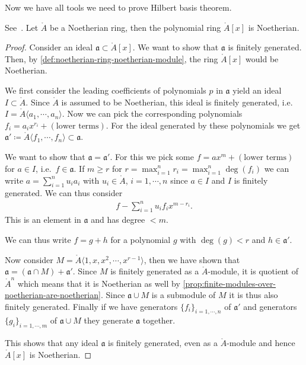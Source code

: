 Now we have all tools we need to prove Hilbert basis theorem.

\begin{theorem}
  \label{thm:hilbert-basis-thm}
  See~\cite{atiyah1994introduction}. Let $\ring{A}$ be a Noetherian ring, then the polynomial ring
  $\ring{A}[x]$ is Noetherian. 
\end{theorem}

\begin{proof}
  Consider an ideal $\mathfrak{a}\subset \ring{A}[x]$. We want to show
  that $\mathfrak{a}$ is finitely generated. Then, by
  \autoref{def:noetherian-ring-noetherian-module}, the ring
  $\ring{A}[x]$ would be Noetherian.

  We first consider the leading coefficients of polynomials $p$ in
  $\mathfrak{a}$ yield an ideal $I\subset \ring{A}$. Since $\ring{A}$
  is assumed to be Noetherian, this ideal is finitely generated, i.e.\
  $I = \ring{A}\langle a_1,\cdots,a_n \rangle$. Now we can pick the
  corresponding polynomials $f_i = a_i x^{r_i} + (\text{lower
    terms})$. For the ideal generated by these polynomials we get
  $\mathfrak{a}' \coloneqq \ring{A}\langle f_1, \cdots , f_n\rangle
  \subset \mathfrak{a}$.

  We want to show that $\mathfrak{a} = \mathfrak{a}'$. For this we pick
  some $f= ax^m + (\text{lower
    terms})$ for $a\in I$, i.e.\ $f\in \mathfrak{a}$.
  If $m\geq r$ for $r = \max_{i=1}^n r_i=\max_{i=1}^n \deg(f_i)$ we
  can write $a = \sum_{i=1}^n u_i a_i$ with $u_i\in\ring{A}$,
  $i=1,\cdots, n$ since $a\in I$ and $I $ is finitely generated. We
  can thus consider
  \begin{align*}
    f-\sum_{i=1}^nu_i f_i x^{m-r_i}.
  \end{align*}
  This is an element in $\mathfrak{a}$ and has degree $<m$.

  We can thus write $f= g + h$ for a polynomial $g$ with $\deg(g)< r$
  and $h\in \mathfrak{a}'$.

  Now consider $M= \ring{A}\langle 1,x,x^2,\cdots, x^{r-1}\rangle$, then we
  have shown that $\mathfrak{a}= (\mathfrak{a}\cap M) +
  \mathfrak{a}'$. Since $M$ is finitely generated as  a
  $\ring{A}$-module, it is quotient of $\ring{A}^n$
  which means that it is Noetherian as well by
  \autoref{prop:finite-modules-over-noetherian-are-noetherian}. Since
  $\mathfrak{a}\cup M $ is a submodule of $M$ it is thus also finitely
  generated. Finally if we have generators $\{f_i\}_{i=1,\cdots,n}$
  of $\mathfrak{a}'$ and generators $\{g_i\}_{i=1,\cdots, m}$ of
  $\mathfrak{a}\cup M $ they generate $\mathfrak{a}$ together.

  This shows that any ideal $\mathfrak{a}$ is finitely generated, even
  as a $\ring{A}$-module and hence $\ring{A}[x]$ is Noetherian.
\end{proof}

